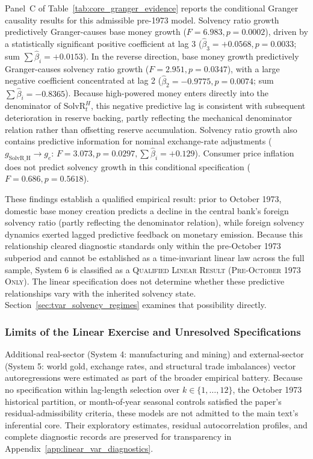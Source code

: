 Panel~C of Table~\ref{tab:core_granger_evidence} reports the conditional Granger causality results for this admissible pre-1973 model. Solvency ratio growth predictively Granger-causes base money growth ($F = 6.983, p = 0.0002$), driven by a statistically significant positive coefficient at lag 3 ($\hat{\beta}_3 = +0.0568, p = 0.0033$; sum $\sum \hat{\beta}_i = +0.0153$). In the reverse direction, base money growth predictively Granger-causes solvency ratio growth ($F = 2.951, p = 0.0347$), with a large negative coefficient concentrated at lag 2 ($\hat{\beta}_2 = -0.9775, p = 0.0074$; sum $\sum \hat{\beta}_i = -0.8365$). Because high-powered money enters directly into the denominator of $\text{SolvR}^H_t$, this negative predictive lag is consistent with subsequent deterioration in reserve backing, partly reflecting the mechanical denominator relation rather than offsetting reserve accumulation. Solvency ratio growth also contains predictive information for nominal exchange-rate adjustments ($g_{\text{SolvR\_H}} \to g_e$: $F = 3.073, p = 0.0297, \sum \hat{\beta}_i = +0.129$). Consumer price inflation does not predict solvency growth in this conditional specification ($F = 0.686, p = 0.5618$).

These findings establish a qualified empirical result: prior to October 1973, domestic base money creation predicts a decline in the central bank's foreign solvency ratio (partly reflecting the denominator relation), while foreign solvency dynamics exerted lagged predictive feedback on monetary emission. Because this relationship cleared diagnostic standards only within the pre-October 1973 subperiod and cannot be established as a time-invariant linear law across the full sample, System 6 is classified as a \textsc{Qualified Linear Result (Pre-October 1973 Only)}. The linear specification does not determine whether these predictive relationships vary with the inherited solvency state. Section~\ref{sec:tvar_solvency_regimes} examines that possibility directly.



\subsubsection{Limits of the Linear Exercise and Unresolved Specifications}
\label{sec:granger_limits}
\label{sec:sign_tournament_synthesis}
\label{sec:granger_diagnostics}

Additional real-sector (System 4: manufacturing and mining) and external-sector (System 5: world gold, exchange rates, and structural trade imbalances) vector autoregressions were estimated as part of the broader empirical battery. Because no specification within lag-length selection over $k \in \{1, \dots, 12\}$, the October 1973 historical partition, or month-of-year seasonal controls satisfied the paper's residual-admissibility criteria, these models are not admitted to the main text's inferential core. Their exploratory estimates, residual autocorrelation profiles, and complete diagnostic records are preserved for transparency in Appendix~\ref{app:linear_var_diagnostics}.

